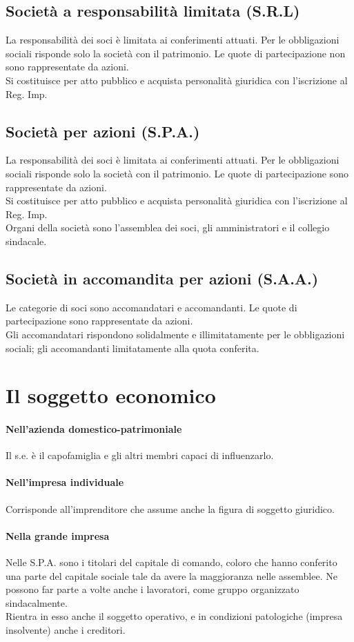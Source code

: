 \documentclass{report}
\begin{document}
	\subsection{Società a responsabilità limitata (S.R.L)}
	La responsabilità dei soci è limitata ai conferimenti attuati. Per le obbligazioni sociali risponde solo la società con il patrimonio. Le quote di partecipazione non sono rappresentate da azioni.\medskip \\Si costituisce per atto pubblico e acquista personalità giuridica con l'iscrizione al Reg. Imp.
	\subsection{Società per azioni (S.P.A.)}
	La responsabilità dei soci è limitata ai conferimenti attuati. Per le obbligazioni sociali risponde solo la società con il patrimonio. Le quote di partecipazione sono rappresentate da azioni.
	\medskip \\Si costituisce per atto pubblico e acquista personalità giuridica con l'iscrizione al Reg. Imp.\medskip \\Organi della società sono l'assemblea dei soci, gli amministratori e il collegio sindacale.
	\subsection{Società in accomandita per azioni (S.A.A.)}
	Le categorie di soci sono accomandatari e accomandanti. Le quote di partecipazione sono rappresentate da azioni.\medskip \\Gli accomandatari rispondono solidalmente e illimitatamente per le obbligazioni sociali; gli accomandanti limitatamente alla quota conferita.
	\section{Il soggetto economico}
	\paragraph{Nell'azienda domestico-patrimoniale} Il s.e. è il capofamiglia e gli altri membri capaci di influenzarlo.
	\paragraph{Nell'impresa individuale}Corrisponde all'imprenditore che assume anche la figura di soggetto giuridico.
	\paragraph{Nella grande impresa}
	Nelle S.P.A. sono i titolari del capitale di comando, coloro che hanno conferito una parte del capitale sociale tale da avere la maggioranza nelle assemblee. Ne possono far parte a volte anche i lavoratori, come gruppo organizzato sindacalmente.
	\medskip \\Rientra in esso anche il soggetto operativo, e in condizioni patologiche (impresa insolvente) anche i creditori.
\end{document}
